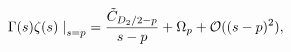 \begin{equation}
    \label{ml}
    \Gamma(s)\zeta(s) \left. \right|_{s=p}= {\tilde
C_{D_2/2-p}\over s-p} +\Omega_p+ {\cal O}((s-p)^2),
\end{equation}

